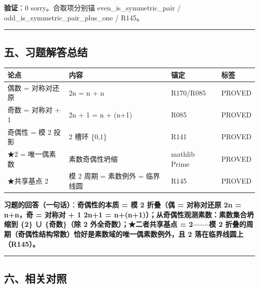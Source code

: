 \documentclass[
]{article}
\newcounter{none} %
\begin{document}
\textbf{验证}：0 sorry。合取项分别锚 even\_is\_symmetric\_pair /
odd\_is\_symmetric\_pair\_plus\_one / R145。

\begin{center}\rule{0.5\linewidth}{0.5pt}\end{center}

\subsection{五、习题解答总结}\label{ux4e94ux4e60ux9898ux89e3ux7b54ux603bux7ed3}

{\def\LTcaptype{none} %
\begin{longtable}[]{@{}llll@{}}
\toprule\noalign{}
论点 & 内容 & 锚定 & 标签 \\
\midrule\noalign{}
\endhead
\bottomrule\noalign{}
\endlastfoot
偶数 = 对称对还原 & 2n = n + n & R170/R085 & PROVED \\
奇数 = 对称对 + 1 & 2n + 1 = n + (n+1) & R085 & PROVED \\
奇偶性 = 模 2 投影 & 2 槽环 \{0,1\} & R141 & PROVED \\
★2 = 唯一偶素数 & 素数奇偶性坍缩 & mathlib Prime & PROVED \\
★共享基点 2 & 模 2 周期 = 素数例外 = 临界线圆 & R145 & PROVED \\
\end{longtable}
}

\textbf{习题的回答（一句话）}：\textbf{奇偶性的本质 = 模 2 折叠（偶 =
对称对还原 2n = n+n，奇 = 对称对 + 1 2n+1 =
n+(n+1)）；从奇偶性观测素数：素数集合坍缩到 \{2\} ∪ \{奇数\}（除 2
外全奇数）；★二者共享基点 = 2------模 2
折叠的周期（奇偶性结构常数）恰好是素数域的唯一偶素数例外，且 2
落在临界线圆上（R145）。}

\begin{center}\rule{0.5\linewidth}{0.5pt}\end{center}

\subsection{六、相关对照}\label{ux516dux76f8ux5173ux5bf9ux7167}
\end{document}
